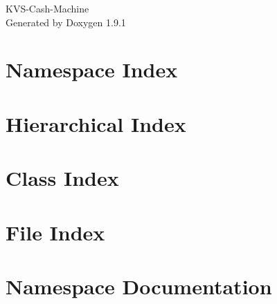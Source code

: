 \let\mypdfximage\pdfximage\def\pdfximage{\immediate\mypdfximage}\documentclass[twoside]{book}
\newcommand{\+}{\discretionary{\mbox{\scriptsize$\hookleftarrow$}}{}{}}
\newcommand{\clearemptydoublepage}{%
  \newpage{\pagestyle{empty}\cleardoublepage}%
}
\begin{document}
\raggedbottom

\hypersetup{pageanchor=false,
             bookmarksnumbered=true,
             pdfencoding=unicode
            }
\begin{titlepage}
\vspace*{7cm}
\begin{center}%
{\Large KVS-\/\+Cash-\/\+Machine }\\
\vspace*{1cm}
{\large Generated by Doxygen 1.9.1}\\
\end{center}
\end{titlepage}
\clearemptydoublepage
{}
\tableofcontents
\clearemptydoublepage
{}
\hypersetup{pageanchor=true}

\chapter{Namespace Index}

\chapter{Hierarchical Index}

\chapter{Class Index}

\chapter{File Index}

\chapter{Namespace Documentation}
















\end{document}
